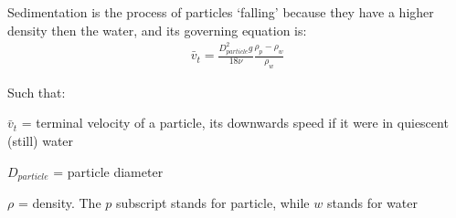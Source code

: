 \documentclass[letterpaper,10pt,english]{sphinxmanual}
\begin{document}
Sedimentation is the process of particles ‘falling’ because they have a higher density then the water, and its governing equation is:
\begin{equation}\label{equation:Introduction/Introduction:eq_laminar_terminal_velocity}
\begin{split}\bar v_t = \frac{D_{particle}^2 g}{18 \nu} \frac{\rho_p - \rho_w}{\rho_w}\end{split}
\end{equation}
\begin{DUlineblock}{0em}
\item[] Such that:
\item[] \(\bar v_t\) = terminal velocity of a particle, its downwards speed if it were in quiescent (still) water
\item[] \(D_{particle}\) = particle diameter
\item[] \(\rho\) = density. The \(p\) subscript stands for particle, while \(w\) stands for water
\end{DUlineblock}
\end{document}

